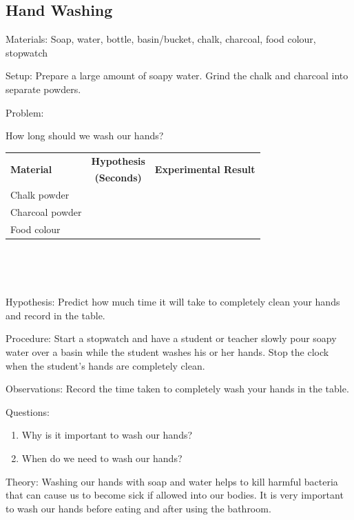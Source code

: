 \subsection{Hand Washing}


\begin{description*}
\item[Materials:]{Soap, water, bottle, basin/bucket, chalk, charcoal, food colour, stopwatch}
\item[Setup:]{Prepare a large amount of soapy water. Grind the chalk and charcoal into separate powders.}\\
\item[Problem:]{How long should we wash our hands?\\

\begin{tabular}{|l|c|c|} \hline
\multirow{2}{*}{\textbf{Material}} & \textbf{Hypothesis} & \multirow{2}{*}{\textbf{Experimental Result}} \\
& \textbf{(Seconds)} & \\ \hline
Chalk powder & & \\ \hline
Charcoal powder & & \\ \hline
Food colour & & \\ \hline
\end{tabular} \\[10pt]
}\\
\item[Hypothesis:]{Predict how much time it will take to completely clean your hands and record in the table.}
\item[Procedure:]{Start a stopwatch and have a student or teacher slowly pour soapy water over a basin while the student washes his or her hands. Stop the clock when the student's hands are completely clean.}
\item[Observations:]{Record the time taken to completely wash your hands in the table.}
\item[Questions:]{}\hfill
\begin{enumerate}
\item Why is it important to wash our hands?
\item When do we need to wash our hands?
\end{enumerate}
\item[Theory:]{Washing our hands with soap and water helps to kill harmful bacteria that can cause us to become sick if allowed into our bodies. It is very important to wash our hands before eating and after using the bathroom.}
\end{description*}

